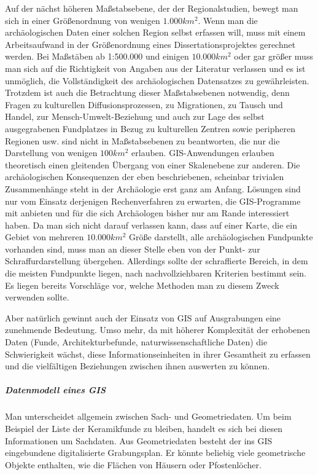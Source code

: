 Auf der nächst höheren Maßstabsebene, der der Regionalstudien, bewegt man sich in einer Größenordnung von wenigen $1.000 km^2$. Wenn man die archäologischen Daten einer solchen Region selbst erfassen will, muss mit einem Arbeitsaufwand in der Größenordnung eines Dissertationsprojektes gerechnet werden. Bei Maßstäben ab 1:500.000 und einigen $10.000 km^2$ oder gar größer muss man sich auf die Richtigkeit von Angaben aus der Literatur verlassen und es ist unmöglich, die Vollständigkeit des archäologischen Datensatzes zu gewährleisten. Trotzdem ist auch die Betrachtung dieser Maßstabsebenen notwendig, denn Fragen zu kulturellen Diffusionsprozessen, zu Migrationen, zu Tausch und Handel, zur Mensch-Umwelt-Beziehung und auch zur Lage des selbst ausgegrabenen Fundplatzes in Bezug zu kulturellen Zentren sowie peripheren Regionen usw. sind nicht in Maßstabsebenen zu beantworten, die nur die Darstellung von wenigen $100 km^2$ erlauben. GIS-Anwendungen erlauben theoretisch einen gleitenden Übergang von einer Skalenebene zur anderen. Die archäologischen Konsequenzen der eben beschriebenen, scheinbar trivialen Zusammenhänge steht in der Archäologie erst ganz am Anfang. Lösungen sind nur vom Einsatz derjenigen Rechenverfahren zu erwarten, die GIS-Programme mit anbieten und für die sich Archäologen bisher nur am Rande interessiert haben. Da man sich nicht darauf verlassen kann, dass auf einer Karte, die ein Gebiet von mehreren $10.000 km^2$ Größe darstellt, alle archäologischen Fundpunkte vorhanden sind, muss man an dieser Stelle eben von der Punkt- zur Schraffurdarstellung übergehen. Allerdings sollte der schraffierte Bereich, in dem die meisten Fundpunkte liegen, nach nachvollziehbaren Kriterien bestimmt sein. Es liegen bereits Vorschläge vor, welche Methoden man zu diesem Zweck verwenden sollte.

Aber natürlich gewinnt auch der Einsatz von GIS auf Ausgrabungen eine zunehmende Bedeutung. Umso mehr, da mit höherer Komplexität der erhobenen Daten (Funde, Architekturbefunde, naturwissenschaftliche Daten) die Schwierigkeit wächst, diese Informationseinheiten in ihrer Gesamtheit zu erfassen und die vielfältigen Beziehungen zwischen ihnen auswerten zu können. 

\subparagraph{Datenmodell eines GIS} Man unterscheidet allgemein zwischen Sach- und Geometriedaten. Um beim Beispiel der Liste der Keramikfunde zu bleiben, handelt es sich bei diesen Informationen um Sachdaten.  Aus Geometriedaten besteht der ins GIS eingebundene digitalisierte Grabungsplan. Er könnte beliebig viele geometrische Objekte enthalten, wie die Flächen von Häusern oder Pfostenlöcher.

